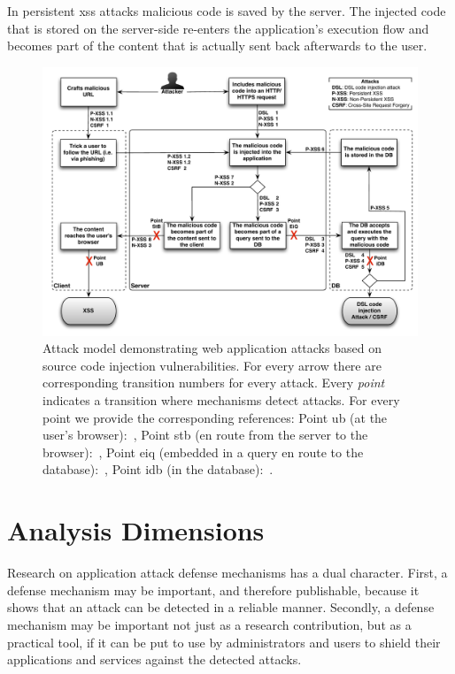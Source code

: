 \documentclass[conference]{IEEEtran}
\begin{document}
In persistent {\sc xss} attacks malicious code is saved by the server.
The injected code that is stored on the server-side re-enters the
application's execution flow and becomes part of the content that is
actually sent back afterwards to the user.

\begin{figure}
\begin{center}
\leavevmode
\includegraphics[scale=0.61]{attacks-steps-new.pdf}
\end{center}
\caption{\label{fig:attacks}Attack model demonstrating web
application attacks based on source
code injection vulnerabilities. For every arrow there are
corresponding transition numbers for
every attack. Every {\it point} indicates a transition where mechanisms
detect attacks. For every point we provide the corresponding
references:
Point {\sc ub} (at the user's browser):~\cite{KJKV09,LV09,TNH07,NSS06,APKLM10,ML10,YCIS07,PSC09,VDDPJ11,OWVS08,DDHPJ10,GC09,VFJKKV07,SLMS14,BV08},
Point {\sc s}t{\sc b} (en route from the server to the browser):~\cite{RDWDE07,JKK06a,JB07,NLC07,WPLKK09,JEP08,PS11},
Point {\sc e}i{\sc q} (embedded in a query en route to the database):~\cite{BWS05,SW06,HCF05,XBS06,PB05,PMP11,MS09,HO05,SMS13},
Point i{\sc db} (in the database):~\cite{BK04,LLW02,VMV05}.}
\end{figure}

\section{Analysis Dimensions}
\label{sec:dimensions}

Research on application attack defense mechanisms has a dual
character. First, a defense mechanism may be important, and therefore
publishable, because it shows that an attack can be detected in a
reliable manner. Secondly, a defense mechanism may be important not
just as a research contribution, but as a practical tool, if it can be
put to use by administrators and users to shield their applications
and services against the detected attacks.
\end{document}
